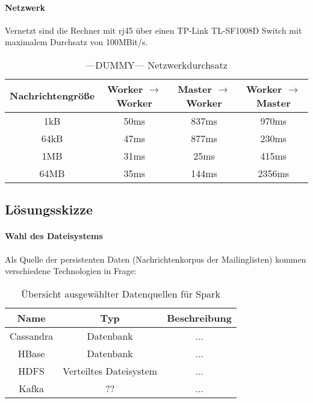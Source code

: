\paragraph{Netzwerk}
Vernetzt sind die Rechner mit \gls{rj45} über einen TP-Link TL-SF1008D Switch mit maximalem Durchsatz von 100MBit/s.

\begin{table}[ht]
	\caption{---DUMMY--- Netzwerkdurchsatz} %
	\centering %
	\begin{tabular}{c c c c} %
	\hline\hline %
	Nachrichtengröße & Worker $\rightarrow$ Worker & Master $\rightarrow$ Worker & Worker $\rightarrow$ Master \\ [0.5ex] %
	\hline %
	1kB & 50ms & 837ms & 970ms \\ %
	64kB & 47ms & 877ms & 230ms \\
	1MB & 31ms & 25ms & 415ms \\
	64MB & 35ms & 144ms & 2356ms \\ [1ex] 
	\hline %
	\end{tabular}
	\label{table:nonlin} %
\end{table}

\subsection{Lösungsskizze}

\paragraph{Wahl des Dateisystems}

Als Quelle der persistenten Daten (Nachrichtenkorpus der Mailinglisten) kommen verschiedene Technologien in Frage:

\begin{table}[ht]
	\caption{Übersicht ausgewählter Datenquellen für Spark} %
	\centering %
	\begin{tabular}{c c c} %
	\hline\hline %
	Name & Typ & Beschreibung\\ [0.5ex] %
	\hline %
	Cassandra & Datenbank & ...\\ %
	HBase & Datenbank & ...\\
	HDFS & Verteiltes Dateisystem & ...\\
	Kafka & ?? & ...\\
	\hline %
	\end{tabular}
	\label{table:dsources} %
\end{table}

